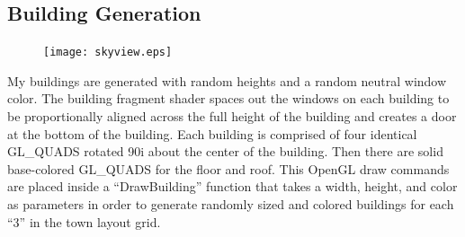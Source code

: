 \documentclass[journal,10pt,onecolumn,compsoc]{IEEEtran}
\begin{document}
\subsection{Building Generation}
\begin{center} 
  \begin{figure}[H]
      \centering
      \texttt{[image: skyview.eps]}
  \end{figure}
\end{center}  
My buildings are generated with random heights and a random neutral window color. The building fragment shader spaces out the windows on each building to be proportionally aligned across the full height of the building and creates a door at the bottom of the building. Each building is comprised of four identical GL\_QUADS rotated 90\textdegree*i about the center of the building. Then there are solid base-colored GL\_QUADS for the floor and roof. This OpenGL draw commands are placed inside a ``DrawBuilding'' function that takes a width, height, and color as parameters in order to generate randomly sized and colored buildings for each ``3'' in the town layout grid.
\end{document}
